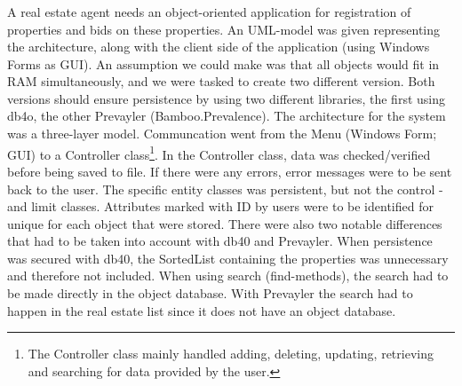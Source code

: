 \subsubsection[C\#]{}
\label{sec:inf313_csharp}
A real estate agent needs an object-oriented application for registration of properties and bids on these properties. 
An UML-model was given representing the architecture, along with the client side of the application (using Windows Forms as GUI).
An assumption we could make was that all objects would fit in RAM simultaneously, and we were tasked to create two different version. 
Both versions should ensure persistence by using two different libraries, the first using db4o, the other Prevayler (Bamboo.Prevalence).
\vspace{0.5em}\newline
The architecture for the system was a three-layer model. 
Communcation went from the Menu (Windows Form; GUI) to a Controller class\footnote{
	The Controller class mainly handled adding, deleting, updating, retrieving and searching for data provided by the user.
}. 
In the Controller class, data was checked/verified before being saved to file. 
If there were any errors, error messages were to be sent back to the user. 
\vspace{0.5em}\newline
The specific entity classes was persistent, but not the control - and limit classes.
Attributes marked with ID by users were to be identified for unique for each object that were stored.
\vspace{0.5em}\newline
There were also two notable differences that had to be taken into account with db40 and Prevayler.
When persistence was secured with db40, the SortedList containing the properties was unnecessary and therefore not included. 
When using search (find-methods), the search had to be made directly in the object database.
With Prevayler the search had to happen in the real estate list since it does not have an object database.

